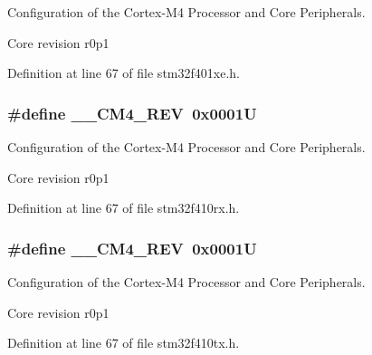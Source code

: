 Configuration of the Cortex-\/\+M4 Processor and Core Peripherals. 

Core revision r0p1 

Definition at line 67 of file stm32f401xe.\+h.

\subsubsection[{\texorpdfstring{\+\_\+\+\_\+\+C\+M4\+\_\+\+R\+EV}{__CM4_REV}}]{\setlength{\rightskip}{0pt plus 5cm}\#define \+\_\+\+\_\+\+C\+M4\+\_\+\+R\+EV~0x0001U}\hypertarget{group___configuration__section__for___c_m_s_i_s_ga45a97e4bb8b6ce7c334acc5f45ace3ba}{}\label{group___configuration__section__for___c_m_s_i_s_ga45a97e4bb8b6ce7c334acc5f45ace3ba}


Configuration of the Cortex-\/\+M4 Processor and Core Peripherals. 

Core revision r0p1 

Definition at line 67 of file stm32f410rx.\+h.

\subsubsection[{\texorpdfstring{\+\_\+\+\_\+\+C\+M4\+\_\+\+R\+EV}{__CM4_REV}}]{\setlength{\rightskip}{0pt plus 5cm}\#define \+\_\+\+\_\+\+C\+M4\+\_\+\+R\+EV~0x0001U}\hypertarget{group___configuration__section__for___c_m_s_i_s_ga45a97e4bb8b6ce7c334acc5f45ace3ba}{}\label{group___configuration__section__for___c_m_s_i_s_ga45a97e4bb8b6ce7c334acc5f45ace3ba}


Configuration of the Cortex-\/\+M4 Processor and Core Peripherals. 

Core revision r0p1 

Definition at line 67 of file stm32f410tx.\+h.


